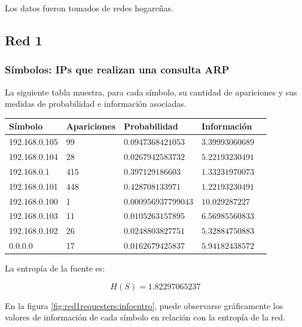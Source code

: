 \documentclass{article}
\begin{document}
Los datos fueron tomados de redes hogareñas.

\subsection{Red 1}
\subsubsection{Símbolos: IPs que realizan una consulta ARP}
La siguiente tabla muestra, para cada símbolo, su cantidad de apariciones y
sus medidas de probabilidad e información asociadas.

\vskip10pt

\begin{tabular}{|l|l|l|l|l|}
  \hline
  Símbolo & Apariciones & Probabilidad & Información \\
  \hline
  192.168.0.105 & 99 & $0.0947368421053$ & $3.39993060689$ \\
  \hline
  192.168.0.104 & 28 & $0.0267942583732$ & $5.22193230491$ \\
  \hline
  192.168.0.1 & 415 & $0.397129186603$  & $1.33231970073$ \\
  \hline
  192.168.0.101 & 448 & $0.428708133971$ & $1.22193230491$ \\
  \hline
  192.168.0.100 & 1 & $0.000956937799043$ & $10.029287227$ \\
  \hline
  192.168.0.103 & 11 & $0.0105263157895$ & $6.56985560833$ \\
  \hline
  192.168.0.102 & 26 & $0.0248803827751$ & $5.32884750883$ \\
  \hline
  0.0.0.0 & 17 & $0.0162679425837$ & $5.94182438572$ \\
  \hline
\end{tabular}

\vskip10pt

La entropía de la fuente es:

$$H(S) = 1.82297065237$$

En la figura \ref{fig:red1requesters:infoentro}, puede observarse gráficamente
los valores de información de cada símbolo en relación con la entropía de la
red.
\end{document}
